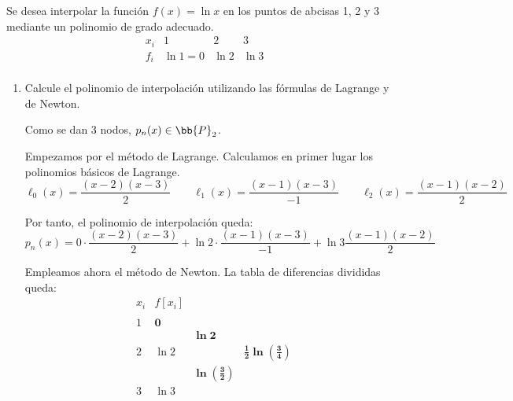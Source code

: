 \begin{ejercicio}
    Se desea interpolar la función $f(x) = \ln x$ en los puntos de abcisas 1, 2 y 3 mediante un polinomio de grado adecuado.
    \begin{equation*}
        \begin{array}{c|cccc}
            x_i & 1 & 2 & 3 \\ \hline
            f_i & \ln 1 = 0 & \ln 2 & \ln 3 \\
        \end{array}
    \end{equation*}
    
    \begin{enumerate}
        \item Calcule el polinomio de interpolación utilizando las fórmulas de Lagrange y de Newton.

        Como se dan 3 nodos, $p_n(x)\in \bb{P}_2$.
        
        Empezamos por el método de Lagrange. Calculamos en primer lugar los polinomios básicos de Lagrange.
        \begin{equation*}
            \ell_0(x) = \frac{(x-2)(x-3)}{2}
            \qquad
            \ell_1(x) = \frac{(x-1)(x-3)}{-1}
            \qquad
            \ell_2(x) = \frac{(x-1)(x-2)}{2}
        \end{equation*}

        Por tanto, el polinomio de interpolación queda:
        \begin{equation*}
            p_n (x) = 0\cdot \frac{(x-2)(x-3)}{2} + \ln 2 \cdot \frac{(x-1)(x-3)}{-1} + \ln 3 \frac{(x-1)(x-2)}{2}
        \end{equation*}

        Empleamos ahora el método de Newton. La tabla de diferencias divididas queda:
        \begin{equation*}
            \begin{array}{c|ccc}
                x_i & f[x_i] \\
                \\
                1 & \textbf{0} \\
                && \mathbf{\ln 2}\\
                2 & \ln 2 & & \mathbf{\frac{1}{2} \ln \left(\frac{3}{4} \right) }\\
                && \mathbf{\ln \left(\frac{3}{2} \right)}\\
                3 & \ln 3 \\
            \end{array}
        \end{equation*}


\end{enumerate}
\end{ejercicio}

